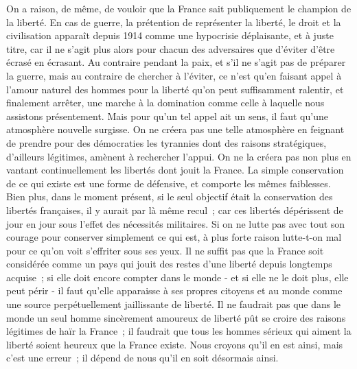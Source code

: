 \documentclass[french,twoside]{book} %
\begin{document}
On a raison, de même, de vouloir que la France sait publiquement le champion de la liberté. En cas de guerre, la prétention de représenter la liberté, le droit et la civilisation apparaît depuis 1914 comme une hypocrisie déplai­sante, et à juste titre, car il ne s'agit plus alors pour chacun des adversaires que d'éviter d'être écrasé en écrasant. Au contraire pendant la paix, et s'il ne s'agit pas de préparer la guerre, mais au contraire de chercher à l'éviter, ce n'est qu'en faisant appel à l'amour naturel des hommes pour la liberté qu'on peut suffisamment ralentir, et finalement arrêter, une marche à la domination comme celle à laquelle nous assistons présentement. Mais pour qu'un tel appel ait un sens, il faut qu'une atmosphère nouvelle surgisse. On ne créera pas une telle atmosphère en feignant de prendre pour des démocraties les tyrannies dont des raisons stratégiques, d'ailleurs légitimes, amènent à rechercher l'appui. On ne la créera pas non plus en vantant continuellement les libertés dont jouit la France. La simple conservation de ce qui existe est une forme de défensive, et comporte les mêmes faiblesses. Bien plus, dans le moment présent, si le seul objectif était la conservation des libertés françaises, il y aurait par là même recul ; car ces libertés dépérissent de jour en jour sous l'effet des nécessités militaires. Si on ne lutte pas avec tout son courage pour conserver simplement ce qui est, à plus forte raison lutte-t-on mal pour ce qu'on voit s'effriter sous ses yeux. Il ne suffit pas que la France soit considérée comme un pays qui jouit des restes d'une liberté depuis longtemps acquise ; si elle doit encore compter dans le monde - et si elle ne le doit plus, elle peut périr - il faut qu'elle apparaisse à ses propres citoyens et au monde comme une source perpétuellement jaillissante de liberté. Il ne faudrait pas que dans le monde un seul homme sincèrement amoureux de liberté pût se croire des raisons légitimes de haïr la France ; il faudrait que tous les hommes sérieux qui aiment la liberté soient heureux que la France existe. Nous croyons qu'il en est ainsi, mais c'est une erreur ; il dépend de nous qu'il en soit désormais ainsi.\par

\begin{center}
\noindent \centerline{}
\end{center}
\end{document}
